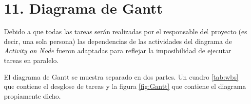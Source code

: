 
\section{11. Diagrama de Gantt}
\label{sec:gantt}

Debido a que todas las tareas serán realizadas por el responsable del proyecto (es decir, una sola persona) las dependencias de las actividades del diagrama de \textit{Activity on Node} fueron adaptadas para reflejar la imposibilidad de ejecutar tareas en paralelo.

El diagrama de Gantt se muestra separado en dos partes. Un cuadro \ref{tab:wbs} que contiene el desglose de tareas y la figura \ref{fig:Gantt} que contiene el diagrama propiamente dicho.

\begin{table}[ht]
  \centering


\end{table}
